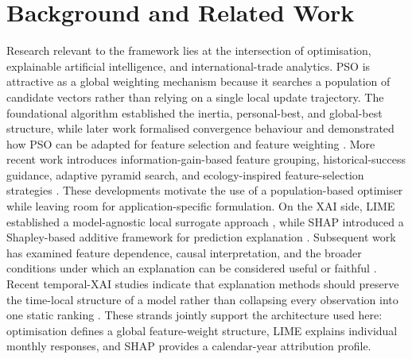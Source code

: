 \documentclass[pdftex,sn-mathphys-num]{sn-jnl}
\begin{document}
\section{Background and Related Work}
Research relevant to the framework lies at the intersection of optimisation, explainable artificial intelligence, and international-trade analytics. PSO is attractive as a global weighting mechanism because it searches a population of candidate vectors rather than relying on a single local update trajectory. The foundational algorithm established the inertia, personal-best, and global-best structure, while later work formalised convergence behaviour and demonstrated how PSO can be adapted for feature selection and feature weighting \cite{kennedy1995,shi1998,clerc2002,poli2007}. More recent work introduces information-gain-based feature grouping, historical-success guidance, adaptive pyramid search, and ecology-inspired feature-selection strategies \cite{gao2024,gupta2024,jin2024,pepspso2025}. These developments motivate the use of a population-based optimiser while leaving room for application-specific formulation. On the XAI side, LIME established a model-agnostic local surrogate approach \cite{ribeiro2016}, while SHAP introduced a Shapley-based additive framework for prediction explanation \cite{lundberg2017}. Subsequent work has examined feature dependence, causal interpretation, and the broader conditions under which an explanation can be considered useful or faithful \cite{aas2021,janzing2020,guidotti2018,schwalbe2024,mersha2024,abusitta2024,longo2024}. Recent temporal-XAI studies indicate that explanation methods should preserve the time-local structure of a model rather than collapsing every observation into one static ranking \cite{canti2024,vanzy2024,hertel2026}. These strands jointly support the architecture used here: optimisation defines a global feature-weight structure, LIME explains individual monthly responses, and SHAP provides a calendar-year attribution profile.
\end{document}
